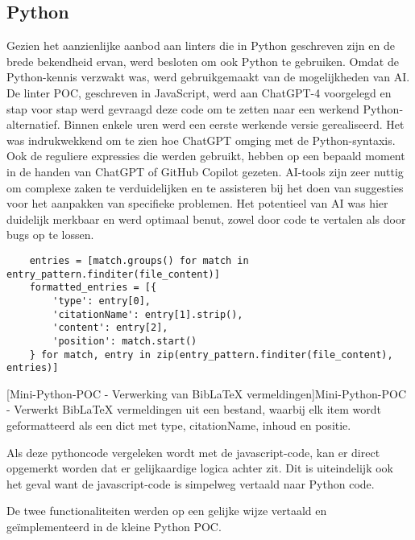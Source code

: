 \subsection{Python}
\label{subsec:python}
Gezien het aanzienlijke aanbod aan linters die in Python geschreven zijn en de brede bekendheid ervan, werd besloten om ook Python te gebruiken. Omdat de Python-kennis verzwakt was, werd gebruikgemaakt van de mogelijkheden van \acrshort{AI}. De linter \acrfull{POC}, geschreven in JavaScript, werd aan ChatGPT-4 voorgelegd en stap voor stap werd gevraagd deze code om te zetten naar een werkend Python-alternatief. Binnen enkele uren werd een eerste werkende versie gerealiseerd. Het was indrukwekkend om te zien hoe ChatGPT omging met de Python-syntaxis. Ook de reguliere expressies die werden gebruikt, hebben op een bepaald moment in de handen van ChatGPT of GitHub Copilot gezeten. \acrshort{AI}-tools zijn zeer nuttig om complexe zaken te verduidelijken en te assisteren bij het doen van suggesties voor het aanpakken van specifieke problemen. Het potentieel van \acrshort{AI} was hier duidelijk merkbaar en werd optimaal benut, zowel door code te vertalen als door bugs op te lossen.

\begin{verbatim}
    entries = [match.groups() for match in entry_pattern.finditer(file_content)]
    formatted_entries = [{
        'type': entry[0],
        'citationName': entry[1].strip(),
        'content': entry[2],
        'position': match.start()
    } for match, entry in zip(entry_pattern.finditer(file_content), entries)]
\end{verbatim}
[Mini-Python-\acrshort{POC} - Verwerking van BibLaTeX vermeldingen]{Mini-Python-\acrshort{POC} - Verwerkt BibLaTeX vermeldingen uit een bestand, waarbij elk item wordt geformatteerd als een dict met type, citationName, inhoud en positie. \label{lst:mini_python_poc_file_content_processing}}

Als deze pythoncode vergeleken wordt met de javascript-code, kan er direct opgemerkt worden dat er gelijkaardige logica achter zit. Dit is uiteindelijk ook het geval want de javascript-code is simpelweg vertaald naar Python code.

De twee functionaliteiten werden op een gelijke wijze vertaald en geïmplementeerd in de kleine Python \acrfull{POC}.

